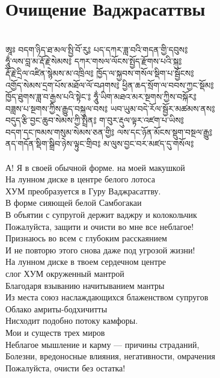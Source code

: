 \section{Очищение Ваджрасаттвы}
\\
\ti
ཨཱཿ བདག་ཉིད་ཐ་མལ་སྤྱི་བོ་རུ༔ པད་དཀར་ཟླ་བའི་གདན་གྱི་དབུས༔ \\
ཧཱུྂ་ལས་བླ་མ་རྡོ་རྗེ་སེམས༔ དཀར་གསལ་ལོངས་སྤྱོད་རྫོགས་པའི་སྐུ༔\\
རྡོ་རྗེ་དྲིལ་འཛིན་སྙེམས་མ་འཁྲིལ༔ ཁྱོད་ལ་སྐྱབས་གསོལ་སྡིག་པ་སྦྱོངས༔ \\
འགྱོད་སེམས་དྲག་པོས་མཐོལ་ལོ་བཤགས༔ ཕྱིན་ཆད་སྲོག་ལ་བབས་ཀྱང་སྡོམ༔ \\
ཁྱོད་ཐུགས་ཟླ་བ་རྒྱས་པའི་སྟེང་༔ ཧཱུྂ་ཡིག་མཐའ་མར་སྔགས་ཀྱིས་བསྐོར༔ \\
བཟླས་པ་སྔགས་ཀྱིས་རྒྱུད་བསྐུལ་བས༔ ཡབ་ཡུམ་བདེ་རོལ་སྦྱོར་མཚམས་ནས༔ \\
བདུད་རྩི་བྱང་ཆུབ་སེམས་ཀྱི་སྤྲིན༔ ག་བུར་རྡུལ་ལྟར་འཛག་པ་ཡིས༔ \\
བདག་དང་ཁམས་གསུམ་སེམས་ཅན་གྱི༔ ལས་དང་ཉོན་མོངས་སྡུག་བསྔལ་རྒྱུ༔ \\
ནད་གདོན་སྡིག་སྒྲིབ་ཉེས་ལྟུང་གྲིབ༔ མ་ལུས་བྱང་བར་མཛད་དུ་གསོལ༔\\
\\
\ru
А! Я в своей обычной форме. на моей макушкой\\
На лунном диске в центре белого лотоса\\
ХУМ преобразуется в Гуру Ваджрасаттву.\\
В форме сияющей белой Самбогакаи\\
В объятии с супругой держит ваджру и колокольчик\\
Пожалуйста, защити и очисти во мне все неблагое!\\
Признаюсь во всем с глубоким расскаянием\\
И не повторю этого снова даже под угрозой жизни!\\
На лунном диске в твоем сердечном центре\\
слог ХУМ окруженный мантрой\\
Благодаря взыванию начитыванием мантры\\
Из места союз наслаждающихся блаженством супругов\\
Облако амриты-бодхичитты\\
Нисходит подобно потоку камфоры.\\
Мои и существ трех миров\\
Неблагое мышление и карму — причины страданий,\\
Болезни, вредоносные влияния, негативности, омрачения\\
Пожалуйста, очисти без остатка!\\

